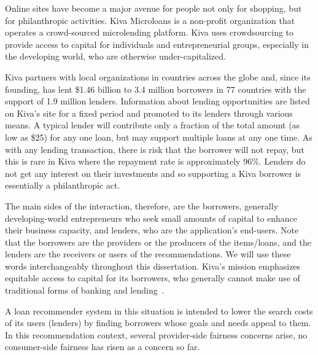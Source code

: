     
    
    Online sites have become a major avenue for people not only for shopping, but for philanthropic activities. Kiva Microloans is a non-profit organization that operates a crowd-sourced microlending platform. Kiva uses crowdsourcing to provide access to capital for individuals and entrepreneurial groups, especially in the developing world, who are otherwise under-capitalized.
    
    Kiva partners with local organizations in countries across the globe and, since its founding, has lent \$1.46 billion to 3.4 million borrowers in 77 countries with the support of 1.9 million lenders. Information about lending opportunities are listed on Kiva's site for a fixed period and promoted to its lenders through various means. A typical lender will contribute only a fraction of the total amount (as low as \$25) for any one loan, but may support multiple loans at any one time. As with any lending transaction, there is risk that the borrower will not repay, but this is rare in Kiva where the repayment rate is approximately 96\%. Lenders do not get any interest on their investments and so supporting a Kiva borrower is essentially a philanthropic act.

    The main sides of the interaction, therefore, are the borrowers, generally developing-world entrepreneurs who seek small amounts of capital to enhance their business capacity, and lenders, who are the application's end-users. Note that the borrowers are the providers or the producers of the items/loans, and the lenders are the receivers or users of the recommendations. We will use these words interchangeably throughout this dissertation. Kiva's mission emphasizes equitable access to capital for its borrowers, who generally cannot make use of traditional forms of banking and lending~\cite{Choo_understanding_kiva}.
    
    
    A loan recommender system in this situation is intended to lower the search costs of its users (lenders) by finding borrowers whose goals and needs appeal to them. In this recommendation context, several provider-side fairness concerns arise, no consumer-side fairness has risen as a concern so far. 
    
